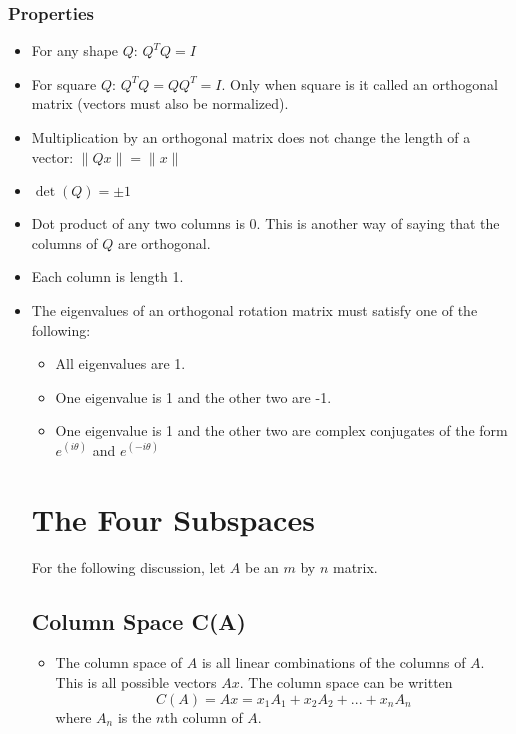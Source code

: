 \documentclass[12pt]{article}
\begin{document}
\subsubsection{Properties}
\begin{itemize}
\item For any shape $Q$: $Q^T Q = I$ 

\item For square $Q$: $Q^T Q = Q Q^T = I$.  Only when square is it called an orthogonal matrix (vectors must also be normalized).

\item Multiplication by an orthogonal matrix does not change the length of a vector: $\|Qx\|=\|x\|$

\item $\det(Q) = \pm 1$

\item Dot product of any two columns is $0$. This is another way of saying that the columns of $Q$ are orthogonal.

\item Each column is length 1.

\item The eigenvalues of an orthogonal rotation matrix must satisfy one of the following:
\begin{itemize}
\item All eigenvalues are 1.
\item One eigenvalue is 1 and the other two are -1.
\item One eigenvalue is 1 and the other two are complex conjugates of the form $e^(i \theta)$ and $e^(-i \theta)$
\end{itemize}

\section{The Four Subspaces}
For the following discussion, let $A$ be an $m$ by $n$ matrix.

\subsection{Column Space C(A)}
\begin{itemize}
\item The column space of $A$ is all linear combinations of the columns of $A$.  This is all possible vectors $Ax$. The column space can be written
\begin{equation*}
C(A) = Ax = x_1A_1 + x_2A_2 + ... + x_n A_n 
\end{equation*}
where $A_n$ is the $n$th column of $A$.


\end{itemize}
\end{itemize}
\end{document}
